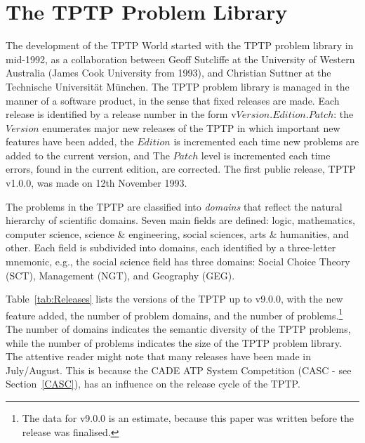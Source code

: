 \documentclass{easychair}
\begin{document}
\section{The TPTP Problem Library}
\label{TPTP}

The development of the TPTP World started with the TPTP problem library in mid-1992, as a 
collaboration between Geoff Sutcliffe at the University of Western Australia (James Cook 
University from 1993), and Christian Suttner at the Technische Universit{\"a}t M{\"u}nchen.
The TPTP problem library is managed in the manner of a software product, in the sense that fixed 
releases are made.
Each release is identified by a release number in the form v$Version$.$Edition$.$Patch$:
the $Version$ enumerates major new releases of the TPTP in which important new features have 
been added,
the $Edition$ is incremented each time new problems are added to the current version, and
The $Patch$ level is incremented each time errors, found in the current edition, are corrected. 
The first public release, TPTP v1.0.0, was made on 12th November 1993.

The problems in the TPTP are classified into {\em domains} that reflect the natural hierarchy of 
scientific domains.
Seven main fields are defined: logic, mathematics, computer science, science \& engineering, 
social sciences, arts \& humanities, and other. 
Each field is subdivided into domains, each identified by a three-letter mnemonic, e.g., the
social science field has three domains: Social Choice Theory (SCT), Management (NGT), and
Geography (GEG).

Table~\ref{tab:Releases} lists the versions of the TPTP up to v9.0.0, with the new feature added, 
the number of problem domains, and the number of problems.\footnote{%
The data for v9.0.0 is an estimate, because this paper was written before the release was
finalised.}
The number of domains indicates the semantic diversity of the TPTP problems, while the number
of problems indicates the size of the TPTP problem library.
The attentive reader might note that many releases have been made in July/August.
This is because the CADE ATP System Competition (CASC - see Section~\ref{CASC}), has an 
influence on the release cycle of the TPTP. 
\end{document}
